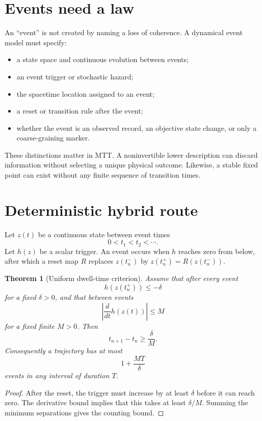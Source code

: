 \documentclass[11pt]{article}
\newtheorem{theorem}{Theorem}[section]
\theoremstyle{definition}
\theoremstyle{remark}
\begin{document}
\tableofcontents

\section{Events need a law}

An ``event'' is not created by naming a loss of coherence. A dynamical event
model must specify:
\begin{itemize}
\item a state space and continuous evolution between events;
\item an event trigger or stochastic hazard;
\item the spacetime location assigned to an event;
\item a reset or transition rule after the event;
\item whether the event is an observed record, an objective state change, or
only a coarse-graining marker.
\end{itemize}

These distinctions matter in MTT. A noninvertible lower description can
discard information without selecting a unique physical outcome. Likewise,
a stable fixed point can exist without any finite sequence of transition
times.

\section{Deterministic hybrid route}

Let \(z(t)\) be a continuous state between event times
\[
 0<t_1<t_2<\cdots.
\]
Let \(h(z)\) be a scalar trigger. An event occurs when \(h\) reaches zero
from below, after which a reset map \(R\) replaces \(z(t_n^-)\) by
\(z(t_n^+)=R(z(t_n^-))\).

\begin{theorem}[Uniform dwell-time criterion]
\label{thm:dwell}
Assume that after every event
\[
 h(z(t_n^+))\leq-\delta
\]
for a fixed \(\delta>0\), and that between events
\[
 \left|\frac{d}{dt}h(z(t))\right|\leq M
\]
for a fixed finite \(M>0\). Then
\[
 t_{n+1}-t_n\geq\frac{\delta}{M}.
\]
Consequently a trajectory has at most
\[
 1+\frac{MT}{\delta}
\]
events in any interval of duration \(T\).
\end{theorem}

\begin{proof}
After the reset, the trigger must increase by at least \(\delta\) before it
can reach zero. The derivative bound implies that this takes at least
\(\delta/M\). Summing the minimum separations gives the counting bound.
\end{proof}
\end{document}
